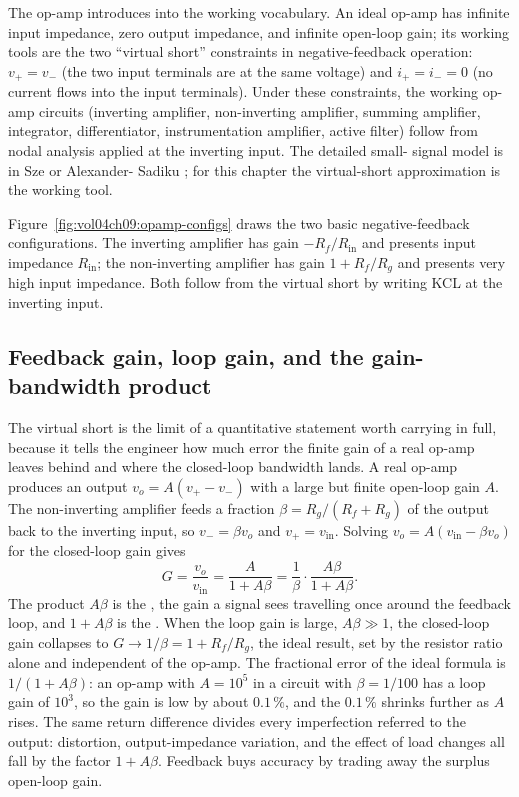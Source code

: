 The op-amp introduces  into the working
vocabulary. An ideal op-amp has infinite input impedance, zero output
impedance, and infinite open-loop gain; its working tools are the two
``virtual short'' constraints in negative-feedback operation:
$v_{+} = v_{-}$ (the two input terminals are at the same voltage) and
$i_{+} = i_{-} = 0$ (no current flows into the input terminals).
Under these constraints, the working op-amp circuits (inverting
amplifier, non-inverting amplifier, summing amplifier, integrator,
differentiator, instrumentation amplifier, active filter) follow from
nodal analysis applied at the inverting input. The detailed small-
signal model is in Sze \cite{text:sze-semiconductor} or Alexander-
Sadiku \cite{text:alexander-sadiku-circuits}; for this chapter the
virtual-short approximation is the working tool.



Figure~\ref{fig:vol04ch09:opamp-configs} draws the two basic
negative-feedback configurations. The inverting amplifier has gain
$-R_f/R_{\text{in}}$ and presents input impedance $R_{\text{in}}$; the
non-inverting amplifier has gain $1+R_f/R_g$ and presents very high
input impedance. Both follow from the virtual short by writing KCL at
the inverting input.

\subsection{Feedback gain, loop gain, and the gain-bandwidth product}

The virtual short is the limit of a quantitative statement worth
carrying in full, because it tells the engineer how much error the
finite gain of a real op-amp leaves behind and where the closed-loop
bandwidth lands. A real op-amp produces an output $v_o = A(v_+ - v_-)$
with a large but finite open-loop gain $A$. The non-inverting amplifier
feeds a fraction $\beta = R_g/(R_f + R_g)$ of the output back to the
inverting input, so $v_- = \beta v_o$ and $v_+ = v_{\text{in}}$. Solving
$v_o = A(v_{\text{in}} - \beta v_o)$ for the closed-loop gain gives
\[
G = \frac{v_o}{v_{\text{in}}} = \frac{A}{1 + A\beta}
= \frac{1}{\beta}\cdot\frac{A\beta}{1 + A\beta}.
\]
The product $A\beta$ is the , the gain a signal sees
travelling once around the feedback loop, and $1 + A\beta$ is the
. When the loop gain is large, $A\beta \gg
1$, the closed-loop gain collapses to $G \to 1/\beta = 1 + R_f/R_g$, the
ideal result, set by the resistor ratio alone and independent of the
op-amp. The fractional error of the ideal formula is $1/(1 + A\beta)$:
an op-amp with $A = 10^{5}$ in a circuit with $\beta = 1/100$ has a loop
gain of $10^{3}$, so the gain is low by about $0.1\,\%$, and the
$0.1\,\%$ shrinks further as $A$ rises. The same return difference
divides every imperfection referred to the output: distortion,
output-impedance variation, and the effect of load changes all fall by
the factor $1 + A\beta$. Feedback buys accuracy by trading away the
surplus open-loop gain.

